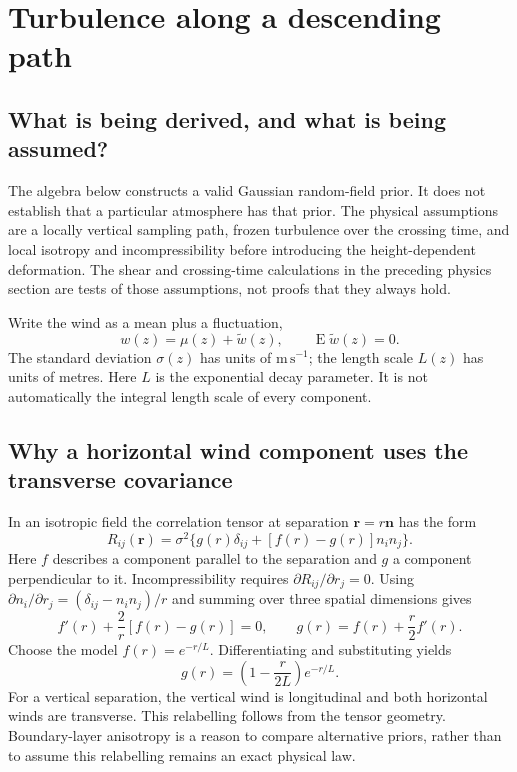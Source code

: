 \documentclass[11pt,a4paper]{article}
\numberwithin{equation}{section}
\begin{document}
\section{Turbulence along a descending path}
\label{sec:turbulence}

\subsection{What is being derived, and what is being assumed?}
The algebra below constructs a valid Gaussian random-field prior. It does not establish that a particular atmosphere has that prior. The physical assumptions are a locally vertical sampling path, frozen turbulence over the crossing time, and local isotropy and incompressibility before introducing the height-dependent deformation. The shear and crossing-time calculations in the preceding physics section are tests of those assumptions, not proofs that they always hold.

Write the wind as a mean plus a fluctuation,
\begin{equation}
 w(z)=\mu(z)+\widetilde w(z),\qquad \operatorname{E}\widetilde w(z)=0.
\end{equation}
The standard deviation $\sigma(z)$ has units of $\mathrm{m\,s^{-1}}$; the length scale $L(z)$ has units of metres. Here $L$ is the exponential decay parameter. It is not automatically the integral length scale of every component.

\subsection{Why a horizontal wind component uses the transverse covariance}
In an isotropic field the correlation tensor at separation $\mathbf r=r\mathbf n$ has the form
\begin{equation}
 R_{ij}(\mathbf r)=\sigma^2\{g(r)\delta_{ij}+[f(r)-g(r)]n_i n_j\}.
\end{equation}
Here $f$ describes a component parallel to the separation and $g$ a component perpendicular to it. Incompressibility requires $\partial R_{ij}/\partial r_j=0$. Using $\partial n_i/\partial r_j=(\delta_{ij}-n_i n_j)/r$ and summing over three spatial dimensions gives
\begin{equation}
 f'(r)+\frac{2}{r}[f(r)-g(r)]=0,
 \qquad \boxed{g(r)=f(r)+\frac r2 f'(r).}
\end{equation}
Choose the model $f(r)=e^{-r/L}$. Differentiating and substituting yields
\begin{equation}
 \boxed{g(r)=\left(1-\frac{r}{2L}\right)e^{-r/L}.}
\end{equation}
For a vertical separation, the vertical wind is longitudinal and both horizontal winds are transverse. This relabelling follows from the tensor geometry. Boundary-layer anisotropy is a reason to compare alternative priors, rather than to assume this relabelling remains an exact physical law.
\end{document}
